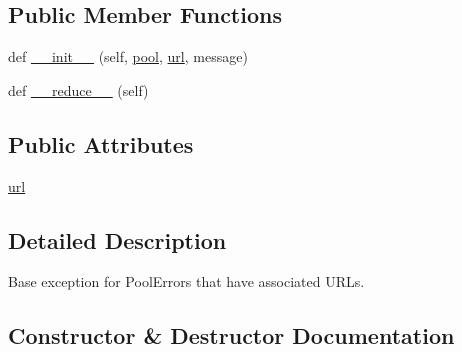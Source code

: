 \subsection*{Public Member Functions}
\begin{DoxyCompactItemize}
\item 
def \hyperlink{classpip_1_1__vendor_1_1urllib3_1_1exceptions_1_1RequestError_a77fe48ca1c251dbdb5f1c901d1879cff}{\+\_\+\+\_\+init\+\_\+\+\_\+} (self, \hyperlink{classpip_1_1__vendor_1_1urllib3_1_1exceptions_1_1PoolError_a2953f9b92fd5cbcd2155a2aac9ef57c9}{pool}, \hyperlink{classpip_1_1__vendor_1_1urllib3_1_1exceptions_1_1RequestError_af4b69f97562d9547e8ee7af0d5485e1d}{url}, message)
\item 
def \hyperlink{classpip_1_1__vendor_1_1urllib3_1_1exceptions_1_1RequestError_abbebcbadd2ac4e649907862e84c3915d}{\+\_\+\+\_\+reduce\+\_\+\+\_\+} (self)
\end{DoxyCompactItemize}
\subsection*{Public Attributes}
\begin{DoxyCompactItemize}
\item 
\hyperlink{classpip_1_1__vendor_1_1urllib3_1_1exceptions_1_1RequestError_af4b69f97562d9547e8ee7af0d5485e1d}{url}
\end{DoxyCompactItemize}


\subsection{Detailed Description}
\begin{DoxyVerb}Base exception for PoolErrors that have associated URLs.\end{DoxyVerb}
 

\subsection{Constructor \& Destructor Documentation}
\mbox{\label{classpip_1_1__vendor_1_1urllib3_1_1exceptions_1_1RequestError_a77fe48ca1c251dbdb5f1c901d1879cff}} 
